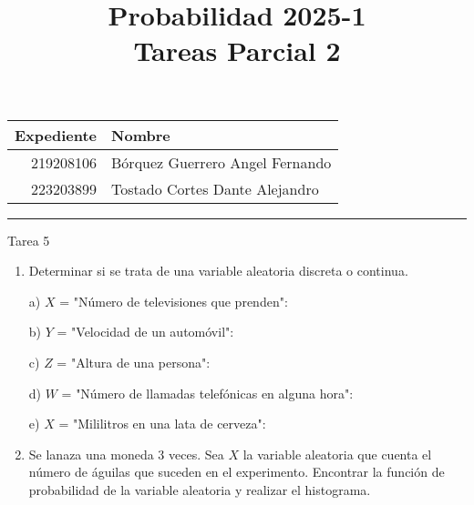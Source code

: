 \documentclass[a4paper, 12pt]{article}
\title
{
  Probabilidad 2025-1 \\
  Tareas Parcial 2
}
\newcommand{\Pspace}{0.5cm}
\newcommand{\Aspace}{0.2cm}
\begin{document}
\maketitle

\begin{center}
    \begin{tabular}{r|l}
        \textbf{Expediente} & \textbf{Nombre} \\ \hline
        219208106 & Bórquez Guerrero Angel Fernando \\
        223203899 & Tostado Cortes Dante Alejandro \\
    \end{tabular}
\end{center}

\rule{\linewidth}{0.3mm}



\vspace{0.3cm}

\begin{center}
    { \LARGE Tarea 5}
\end{center}

\begin{enumerate}
    \item Determinar si se trata de una variable aleatoria discreta o continua.
    \vspace{\Aspace} \par
    a) $X$ = "Número de televisiones que prenden":
    \\ { \color{azul}  }

    \vspace{\Aspace} \par
    b) $Y$ = "Velocidad de un automóvil":
    \\ { \color{azul}  }
    
    \vspace{\Aspace} \par
    c) $Z$ = "Altura de una persona":
    \\ { \color{azul}  }

    \vspace{\Aspace} \par
    d) $W$ = "Número de llamadas telefónicas en alguna hora":
    \\ { \color{azul}  }

    \vspace{\Aspace} \par
    e) $X$ = "Mililitros en una lata de cerveza":
    \\ { \color{azul}  }


    \vspace{\Pspace}
    \item Se lanaza una moneda 3 veces. Sea $X$ la variable aleatoria que cuenta el número de águilas que suceden en el experimento. Encontrar la función de probabilidad de la variable aleatoria y realizar el histograma.
    \vspace{\Aspace} \par
    { \color{azul}  }
\end{enumerate}
\end{document}

